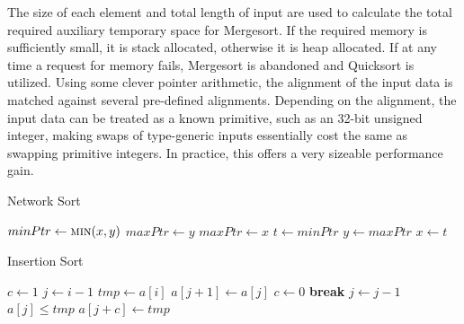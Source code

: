 \documentclass[12pt, conference]{ieeeconf}
\begin{document}
The size of each element and total length of input are used to calculate the
total required auxiliary temporary space for Mergesort. If the required memory
is sufficiently small, it is stack allocated, otherwise it is heap allocated. If
at any time a request for memory fails, Mergesort is abandoned and Quicksort is
utilized. Using some clever pointer arithmetic, the alignment of the input data
is matched against several pre-defined alignments. Depending on the alignment,
the input data can be treated as a known primitive, such as an 32-bit unsigned
integer, making swaps of type-generic inputs essentially cost the same as
swapping primitive integers. In practice, this offers a very sizeable
performance gain.

\begin{algorithm}[ht]
	\caption{Network Sort}
	\label{alg:network_sort}
	\begin{algorithmic}
		\State $minPtr \gets \Call{min}{x, y}$
		\State $maxPtr \gets y$
		\Else
		\State $maxPtr \gets x$
		\EndIf
		\State $t \gets minPtr$
		\State $y \gets maxPtr$
		\State $x \gets t$
		\EndProcedure

		\State {}
		\State {}
		\State {}
		\EndProcedure

		\State {}
		\State {}
		\State {}
		\State {}
		\State {}
		\EndProcedure
	\end{algorithmic}
\end{algorithm}

\begin{algorithm}[ht]
	\caption{Insertion Sort}
	\label{alg:insertion_sort}
	\begin{algorithmic}
		\Procedure{INS\_SORT}{a, n}
		\For {$i \gets 1$ to $n$}
		\State $c \gets 1$
		\State $j \gets i - 1$
		\If {$a[j] > a[i]$}
		\State $tmp \gets a[i]$
		\Repeat
		\State $a[j + 1] \gets a[j]$
		\If {$j = 0$}
		\State $c \gets 0$
		\State \textbf{break}
		\EndIf
		\State $j \gets j - 1$
		\Until $a[j] \le tmp$
		\State $a[j + c] \gets tmp$
		\EndIf
		\EndFor
		\EndProcedure
	\end{algorithmic}
\end{algorithm}
\end{document}
